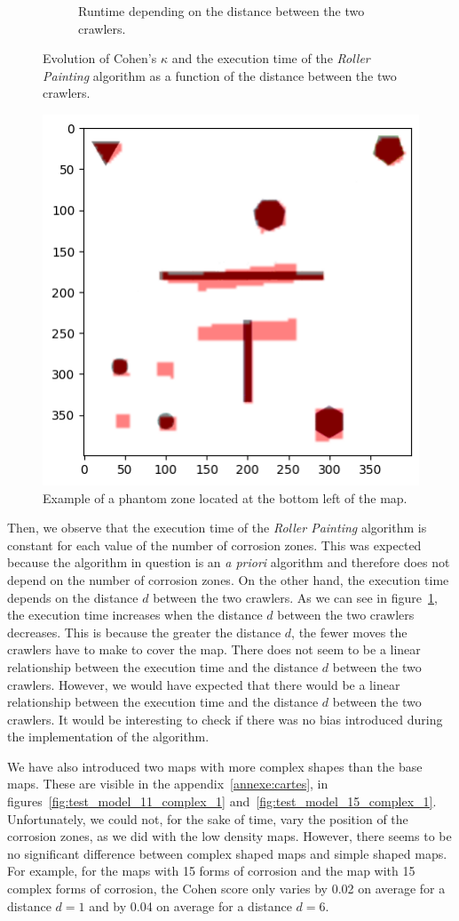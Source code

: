 \documentclass[english,RandD]{rapportPFE}  %
\begin{document}
\begin{figure}[h!]
\begin{subfigure}[t]{0.49\linewidth}
						\caption{Runtime depending on the distance between the two crawlers.}
						\label{fig:peinture_au_rouleau-time_vs_distance}
				\end{subfigure}
				\caption{Evolution of Cohen's $\kappa$ and the execution time of the \textit{Roller Painting} algorithm as a function of the distance between the two crawlers.}
				\label{fig:peinture_au_rouleau-distance}
			\end{figure}

			\begin{figure}[h!]
				\centering
				\includegraphics[width=0.5\linewidth]{graphics/output.png}
				\caption{Example of a phantom zone located at the bottom left of the map.}
				\label{fig:ghost_zone}
			\end{figure}

			Then, we observe that the execution time of the \textit{Roller Painting} algorithm is constant for each value of the number of corrosion zones.
			This was expected because the algorithm in question is an \textit{a priori} algorithm and therefore does not depend on the number of corrosion zones.
			On the other hand, the execution time depends on the distance $d$ between the two crawlers.
			As we can see in figure~\ref{fig:peinture_au_rouleau-time_vs_distance}, the execution time increases when the distance $d$ between the two crawlers decreases.
			This is because the greater the distance $d$, the fewer moves the crawlers have to make to cover the map.
			There does not seem to be a linear relationship between the execution time and the distance $d$ between the two crawlers.
			However, we would have expected that there would be a linear relationship between the execution time and the distance $d$ between the two crawlers.
			It would be interesting to check if there was no bias introduced during the implementation of the algorithm.

			We have also introduced two maps with more complex shapes than the base maps.
			These are visible in the appendix~\ref{annexe:cartes}, in figures~\ref{fig:test_model_11_complex_1} and~\ref{fig:test_model_15_complex_1}.
			Unfortunately, we could not, for the sake of time, vary the position of the corrosion zones, as we did with the low density maps.
			However, there seems to be no significant difference between complex shaped maps and simple shaped maps.
			For example, for the maps with 15 forms of corrosion and the map with 15 complex forms of corrosion, the Cohen score only varies by 0.02 on average for a distance $d = 1$ and by 0.04 on average for a distance $d = 6$.
\end{document}
